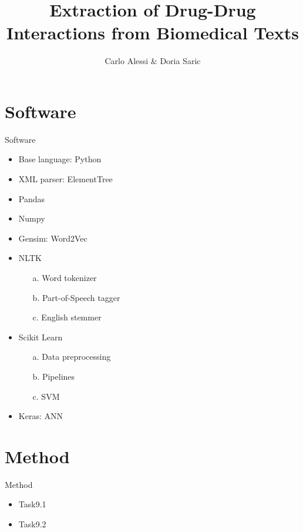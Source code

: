 \documentclass[11pt]{beamer}
\author{Carlo Alessi \& Doria Saric}
\title{Extraction of Drug-Drug Interactions from Biomedical Texts}
\begin{document}

\begin{frame}
\titlepage
\end{frame}


\section{Software}
\begin{frame}{Software}
\begin{itemize}
\item Base language: Python
\item XML parser: ElementTree
\item Pandas
\item Numpy
\item Gensim: Word2Vec
\item NLTK
\begin{itemize}
\item[a.] Word tokenizer
\item[b.] Part-of-Speech tagger
\item[c.] English stemmer
\end{itemize}
\item Scikit Learn
\begin{itemize}
\item[a.] Data preprocessing
\item[b.] Pipelines
\item[c.] SVM
\end{itemize}
\item Keras: ANN
\end{itemize}
\end{frame}

\section{Method}
\begin{frame}{Method}
\begin{itemize}
\item Task9.1
\item Task9.2
\end{itemize}
\end{frame}
\end{document}
